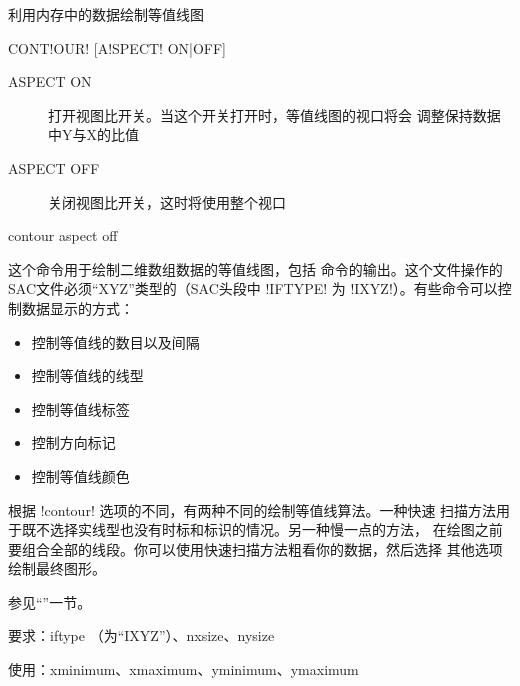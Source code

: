 \label{cmd:contour}

利用内存中的数据绘制等值线图

\begin{SACSTX}
CONT!OUR! [A!SPECT! ON|OFF]
\end{SACSTX}

\begin{description}
\item [ASPECT ON] 打开视图比开关。当这个开关打开时，等值线图的视口将会
    调整保持数据中Y与X的比值
\item [ASPECT OFF] 关闭视图比开关，这时将使用整个视口
\end{description}

\begin{SACDFT}
contour aspect off
\end{SACDFT}

这个命令用于绘制二维数组数据的等值线图，包括 
命令的输出。这个文件操作的SAC文件必须``XYZ''类型的（SAC头段中 !IFTYPE!
为 !IXYZ!）。有些命令可以控制数据显示的方式：
\begin{itemize}
\item {} 控制等值线的数目以及间隔
\item {} 控制等值线的线型
\item {} 控制等值线标签
\item {} 控制方向标记
\item {} 控制等值线颜色
\end{itemize}

根据 !contour! 选项的不同，有两种不同的绘制等值线算法。一种快速
扫描方法用于既不选择实线型也没有时标和标识的情况。另一种慢一点的方法，
在绘图之前要组合全部的线段。你可以使用快速扫描方法粗看你的数据，然后选择
其他选项绘制最终图形。

参见``''一节。

要求：iftype （为``IXYZ''）、nxsize、nysize

使用：xminimum、xmaximum、yminimum、ymaximum
